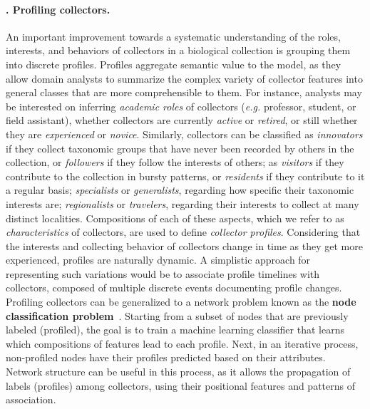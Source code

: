 \paragraph*{\theApplicationCase. Profiling collectors.}
An important improvement towards a systematic understanding of the roles, interests, and behaviors of collectors in a biological collection is grouping them into discrete profiles.
Profiles aggregate semantic value to the model, as they allow domain analysts to summarize the complex variety of collector features into general classes that are more comprehensible to them.
%
For instance, analysts may be interested on inferring \textit{academic roles} of collectors (\textit{e.g.} professor, student, or field assistant), whether collectors are currently \textit{active} or \textit{retired}, or still whether they are \textit{experienced} or \textit{novice}.
Similarly, collectors can be classified as \textit{innovators} if they collect taxonomic groups that have never been recorded by others in the collection, or \textit{followers} if they follow the interests of others;
as \textit{visitors} if they contribute to the collection in bursty patterns, or \textit{residents} if they contribute to it a regular basis;
\textit{specialists} or \textit{generalists}, regarding how specific their taxonomic interests are;
\textit{regionalists} or \textit{travelers}, regarding their interests to collect at many distinct localities.
Compositions of each of these aspects, which we refer to as \textit{characteristics} of collectors, are used to define \textit{collector profiles}.
Considering that the interests and collecting behavior of collectors change in time as they get more experienced, profiles are naturally dynamic.
A simplistic approach for representing such variations would be to associate profile timelines with collectors, composed of multiple discrete events documenting profile changes.
%
Profiling collectors can be generalized to a network problem known as the \textbf{node classification problem}~\cite{Bhagat2011}.
Starting from a subset of nodes that are previously labeled (profiled), the goal is to train a machine learning classifier that learns which compositions of features lead to each profile.
Next, in an iterative process, non-profiled nodes have their profiles predicted based on their attributes.
Network structure can be useful in this process, as it allows the propagation of labels (profiles) among collectors, using their positional features and patterns of association.


